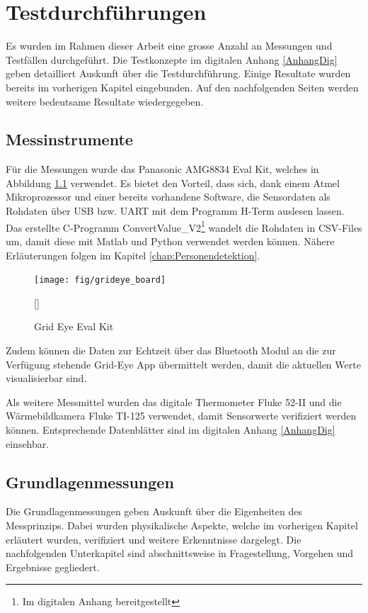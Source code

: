 \chapter{Testdurchführungen}
\label{chap:Testphasen}

Es wurden im Rahmen dieser Arbeit eine grosse Anzahl an Messungen und Testfällen durchgeführt. Die Testkonzepte im digitalen Anhang \ref{AnhangDig} geben detailliert Auskunft über die Testdurchführung. Einige Resultate wurden bereits im vorherigen Kapitel eingebunden. Auf den nachfolgenden Seiten werden weitere bedeutsame Resultate wiedergegeben. 

\section{Messinstrumente}

Für die Messungen wurde das Panasonic AMG8834 Eval Kit, welches in Abbildung \ref{fig:grideyeboard} verwendet. Es bietet den Vorteil, dass sich, dank einem Atmel Mikroprozessor und einer bereits vorhandene Software, die Sensordaten als Rohdaten über USB bzw. \ac{UART} mit dem Programm H-Term auslesen lassen. 
Das erstellte C-Programm ConvertValue\_V2\footnote[13]{Im digitalen Anhang bereitgestellt} wandelt die Rohdaten in \ac{CSV}-Files um, damit diese mit Matlab und Python verwendet werden können. Nähere Erläuterungen folgen im Kapitel \ref{chap:Personendetektion}.


\begin{figure}[H]
	\centering
	\texttt{[image: fig/grideye\_board]}
	\caption[Grid Eye Eval Kit]{Grid Eye Eval Kit}
	\label{fig:grideyeboard}
	[\protect\cite{AMG8834}]
\end{figure}



Zudem können die Daten zur Echtzeit über das Bluetooth Modul an die zur Verfügung stehende Grid-Eye App übermittelt werden, damit die aktuellen Werte visualisierbar sind.

Als weitere Messmittel wurden das digitale Thermometer Fluke 52-II und die Wärmebildkamera Fluke TI-125 verwendet, damit Sensorwerte verifiziert werden können. Entsprechende Datenblätter sind im digitalen Anhang \ref{AnhangDig} einsehbar.

\section{Grundlagenmessungen}

Die Grundlagenmessungen geben Auskunft über die Eigenheiten des Messprinzips. Dabei wurden physikalische Aspekte, welche im vorherigen Kapitel erläutert wurden, verifiziert und weitere Erkenntnisse dargelegt. Die nachfolgenden Unterkapitel sind abschnittsweise in Fragestellung, Vorgehen und Ergebnisse gegliedert.

